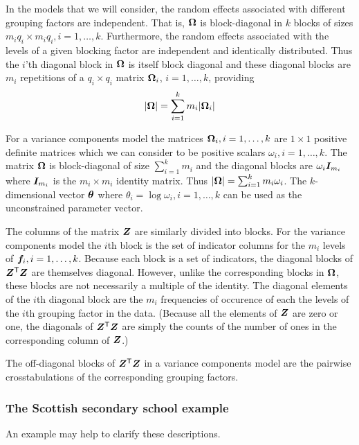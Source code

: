 \documentclass[12pt]{article}
\begin{document}
In the models that we will consider, the random effects associated
with different grouping factors are independent.  That is,
$\bm{\Omega}$ is block-diagonal in $k$ blocks of sizes
$m_i q_i\times m_i q_i,i=1,\dots,k$.  Furthermore, the random effects
associated with the levels of a given blocking factor are independent
and identically distributed.  Thus the $i$'th diagonal block in
$\bm{\Omega}$ is itself block diagonal and these diagonal blocks are $m_i$
repetitions of a $q_i\times q_i$ matrix $\bm{\Omega}_i$, $i=1,\dots,k$, providing
\begin{equation}
  \label{eq:OmegaDet}
  |\bm{\Omega}|=\sum_{i=1}^k m_i |\bm{\Omega}_i|
\end{equation}

For a variance components model the matrices $\bm{\Omega}_i,i=1,\dots,k$
are $1\times 1$ positive definite matrices which we can consider to be
positive scalars $\omega_i,i=1,\dots,k$.  The matrix $\bm{\Omega}$ is
block-diagonal of size $\sum_{i=1}^k m_i$ and the diagonal blocks are
$\omega_i\bm{I}_{m_i}$ where $\bm{I}_{m_i}$ is the $m_i\times m_i$ identity
matrix.  Thus $\left|\bm{\Omega}\right|=\sum_{i=1}^k m_i\omega_i$. The
$k$-dimensional vector $\bm{\theta}$ where
$\theta_i=\log\omega_i,i=1,\dots,k$ can be used as the unconstrained
parameter vector.

The columns of the matrix $\bm{Z}$ are similarly divided into blocks.
For the variance components model the $i$th block is the set of
indicator columns for the $m_i$ levels of $\bm{f}_i,i=1,\dots,k$.
Because each block is a set of indicators, the diagonal blocks of
$\bm{Z}^\mathsf{T}\bm{Z}$ are themselves diagonal.  However, unlike the
corresponding blocks in $\bm{\Omega}$, these blocks are not necessarily a
multiple of the identity.  The diagonal elements of the $i$th diagonal
block are the $m_i$ frequencies of occurence of each the levels of the
$i$th grouping factor in the data.  (Because all the elements of $\bm{Z}$
are zero or one, the diagonals of $\bm{Z}^\mathsf{T}\bm{Z}$ are simply the counts
of the number of ones in the corresponding column of $\bm{Z}$.)

The off-diagonal blocks of $\bm{Z}^\mathsf{T}\bm{Z}$ in a variance components
model are the pairwise crosstabulations of the corresponding grouping
factors.


\subsubsection{The Scottish secondary school example}
\label{ssec:Scottish}

An example may help to clarify these descriptions.
\end{document}
